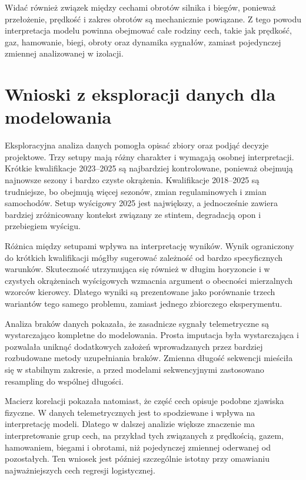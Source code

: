 \documentclass[printmode,pl]{mgr}
\begin{document}
Widać również związek między cechami obrotów silnika i biegów, ponieważ przełożenie, prędkość i zakres obrotów są mechanicznie powiązane. Z tego powodu interpretacja modelu powinna obejmować całe rodziny cech, takie jak prędkość, gaz, hamowanie, biegi, obroty oraz dynamika sygnałów, zamiast pojedynczej zmiennej analizowanej w izolacji.

\section{Wnioski z eksploracji danych dla modelowania}

Eksploracyjna analiza danych pomogła opisać zbiory oraz podjąć decyzje projektowe. Trzy setupy mają różny charakter i wymagają osobnej interpretacji. Krótkie kwalifikacje 2023--2025 są najbardziej kontrolowane, ponieważ obejmują najnowsze sezony i bardzo czyste okrążenia. Kwalifikacje 2018--2025 są trudniejsze, bo obejmują więcej sezonów, zmian regulaminowych i zmian samochodów. Setup wyścigowy 2025 jest największy, a jednocześnie zawiera bardziej zróżnicowany kontekst związany ze stintem, degradacją opon i przebiegiem wyścigu.

Różnica między setupami wpływa na interpretację wyników. Wynik ograniczony do krótkich kwalifikacji mógłby sugerować zależność od bardzo specyficznych warunków. Skuteczność utrzymująca się również w długim horyzoncie i w czystych okrążeniach wyścigowych wzmacnia argument o obecności mierzalnych wzorców kierowcy. Dlatego wyniki są prezentowane jako porównanie trzech wariantów tego samego problemu, zamiast jednego zbiorczego eksperymentu.

Analiza braków danych pokazała, że zasadnicze sygnały telemetryczne są wystarczająco kompletne do modelowania. Prosta imputacja była wystarczająca i pozwalała uniknąć dodatkowych założeń wprowadzanych przez bardziej rozbudowane metody uzupełniania braków. Zmienna długość sekwencji mieściła się w stabilnym zakresie, a przed modelami sekwencyjnymi zastosowano resampling do wspólnej długości.

Macierz korelacji pokazała natomiast, że część cech opisuje podobne zjawiska fizyczne. W danych telemetrycznych jest to spodziewane i wpływa na interpretację modeli. Dlatego w dalszej analizie większe znaczenie ma interpretowanie grup cech, na przykład tych związanych z prędkością, gazem, hamowaniem, biegami i obrotami, niż pojedynczej zmiennej oderwanej od pozostałych. Ten wniosek jest później szczególnie istotny przy omawianiu najważniejszych cech regresji logistycznej.
\end{document}
